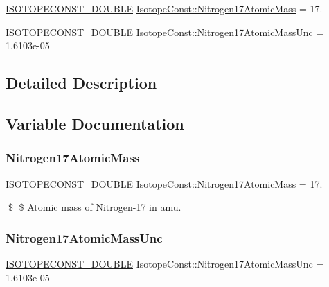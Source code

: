 \begin{DoxyCompactItemize}
\item 
\mbox{\hyperlink{group___isotope_const-_macros_ga8f45a7272ce02c0b4c65c44636ed719a}{I\+S\+O\+T\+O\+P\+E\+C\+O\+N\+S\+T\+\_\+\+D\+O\+U\+B\+LE}} \mbox{\hyperlink{group___isotope_const-_nitrogen-_n17_ga465522354ec5c8afdeae95e6b729e34d}{Isotope\+Const\+::\+Nitrogen17\+Atomic\+Mass}} = 17.
\item 
\mbox{\hyperlink{group___isotope_const-_macros_ga8f45a7272ce02c0b4c65c44636ed719a}{I\+S\+O\+T\+O\+P\+E\+C\+O\+N\+S\+T\+\_\+\+D\+O\+U\+B\+LE}} \mbox{\hyperlink{group___isotope_const-_nitrogen-_n17_gac6373d1eb0d9b8691f8bece1b3c7df67}{Isotope\+Const\+::\+Nitrogen17\+Atomic\+Mass\+Unc}} = 1.\+6103e-\/05
\end{DoxyCompactItemize}


\subsection{Detailed Description}


\subsection{Variable Documentation}
\mbox{\label{group___isotope_const-_nitrogen-_n17_ga465522354ec5c8afdeae95e6b729e34d}} 
\subsubsection{\texorpdfstring{Nitrogen17\+Atomic\+Mass}{Nitrogen17AtomicMass}}
{\footnotesize\ttfamily \mbox{\hyperlink{group___isotope_const-_macros_ga8f45a7272ce02c0b4c65c44636ed719a}{I\+S\+O\+T\+O\+P\+E\+C\+O\+N\+S\+T\+\_\+\+D\+O\+U\+B\+LE}} Isotope\+Const\+::\+Nitrogen17\+Atomic\+Mass = 17.}

\$ \$ Atomic mass of Nitrogen-\/17 in amu. \mbox{\label{group___isotope_const-_nitrogen-_n17_gac6373d1eb0d9b8691f8bece1b3c7df67}} 
\subsubsection{\texorpdfstring{Nitrogen17\+Atomic\+Mass\+Unc}{Nitrogen17AtomicMassUnc}}
{\footnotesize\ttfamily \mbox{\hyperlink{group___isotope_const-_macros_ga8f45a7272ce02c0b4c65c44636ed719a}{I\+S\+O\+T\+O\+P\+E\+C\+O\+N\+S\+T\+\_\+\+D\+O\+U\+B\+LE}} Isotope\+Const\+::\+Nitrogen17\+Atomic\+Mass\+Unc = 1.\+6103e-\/05}

